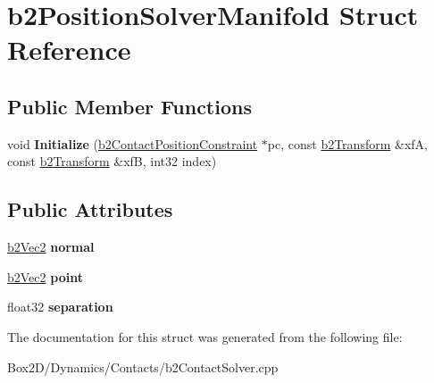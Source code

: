\hypertarget{structb2_position_solver_manifold}{}\section{b2\+Position\+Solver\+Manifold Struct Reference}
\label{structb2_position_solver_manifold}
\subsection*{Public Member Functions}
\begin{DoxyCompactItemize}
\item 
\mbox{\label{structb2_position_solver_manifold_affdfc2c9f455008e865b2dd6947796fa}} 
void {\bfseries Initialize} (\hyperlink{structb2_contact_position_constraint}{b2\+Contact\+Position\+Constraint} $\ast$pc, const \hyperlink{structb2_transform}{b2\+Transform} \&xfA, const \hyperlink{structb2_transform}{b2\+Transform} \&xfB, int32 index)
\end{DoxyCompactItemize}
\subsection*{Public Attributes}
\begin{DoxyCompactItemize}
\item 
\mbox{\label{structb2_position_solver_manifold_a4a1073e69ab49f55b7013d4aef96fe1c}} 
\hyperlink{structb2_vec2}{b2\+Vec2} {\bfseries normal}
\item 
\mbox{\label{structb2_position_solver_manifold_a9b7a88173cc0295e2883e2ac8b7c46f2}} 
\hyperlink{structb2_vec2}{b2\+Vec2} {\bfseries point}
\item 
\mbox{\label{structb2_position_solver_manifold_a9dd76b0c774238d3e3745d139cf6eea4}} 
float32 {\bfseries separation}
\end{DoxyCompactItemize}


The documentation for this struct was generated from the following file\+:\begin{DoxyCompactItemize}
\item 
Box2\+D/\+Dynamics/\+Contacts/b2\+Contact\+Solver.\+cpp\end{DoxyCompactItemize}
